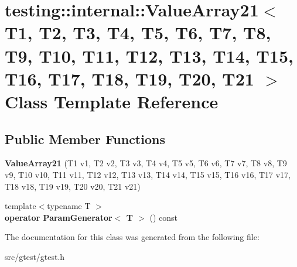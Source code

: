 \hypertarget{classtesting_1_1internal_1_1_value_array21}{}\section{testing\+:\+:internal\+:\+:Value\+Array21$<$ T1, T2, T3, T4, T5, T6, T7, T8, T9, T10, T11, T12, T13, T14, T15, T16, T17, T18, T19, T20, T21 $>$ Class Template Reference}
\label{classtesting_1_1internal_1_1_value_array21}
\subsection*{Public Member Functions}
\begin{DoxyCompactItemize}
\item 
\mbox{\label{classtesting_1_1internal_1_1_value_array21_a111043ab8258ecb243c67c84d1f8e0f4}} 
{\bfseries Value\+Array21} (T1 v1, T2 v2, T3 v3, T4 v4, T5 v5, T6 v6, T7 v7, T8 v8, T9 v9, T10 v10, T11 v11, T12 v12, T13 v13, T14 v14, T15 v15, T16 v16, T17 v17, T18 v18, T19 v19, T20 v20, T21 v21)
\item 
\mbox{\label{classtesting_1_1internal_1_1_value_array21_aa5b2264c55d6b5315622e2e5c3deeb35}} 
{\footnotesize template$<$typename T $>$ }\\{\bfseries operator Param\+Generator$<$ T $>$} () const
\end{DoxyCompactItemize}


The documentation for this class was generated from the following file\+:\begin{DoxyCompactItemize}
\item 
src/gtest/gtest.\+h\end{DoxyCompactItemize}

